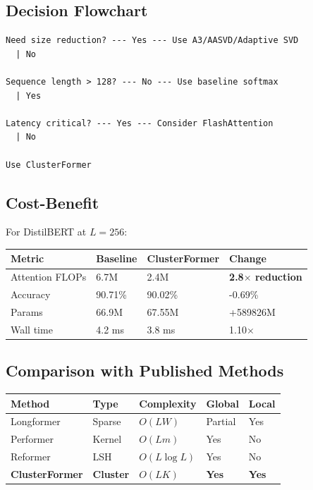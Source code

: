 \subsection{Decision Flowchart}

\begin{lstlisting}
Need size reduction? --- Yes --- Use A3/AASVD/Adaptive SVD
  | No
   
Sequence length > 128? --- No --- Use baseline softmax
  | Yes
   
Latency critical? --- Yes --- Consider FlashAttention
  | No
   
Use ClusterFormer
\end{lstlisting}

\subsection{Cost-Benefit}

For DistilBERT at $L=256$:

\begin{table}[H]
\centering
\small
\begin{tabular}{llll}
\toprule
\textbf{Metric} & \textbf{Baseline} & \textbf{ClusterFormer} & \textbf{Change} \\
\midrule
Attention FLOPs & 6.7M & 2.4M & \textbf{2.8$\times$ reduction} \\
Accuracy & 90.71\% & 90.02\% & -0.69\% \\
Params & 66.9M & 67.55M & +589826M \\
Wall time & 4.2 ms & 3.8 ms & 1.10$\times$ \\
\bottomrule
\end{tabular}
\end{table}

\subsection{Comparison with Published Methods}

\begin{table}[H]
\centering
\small
\begin{tabular}{lllll}
\toprule
\textbf{Method} & \textbf{Type} & \textbf{Complexity} & \textbf{Global} & \textbf{Local} \\
\midrule
Longformer & Sparse & $O(LW)$ & Partial & Yes \\
Performer & Kernel & $O(Lm)$ & Yes & No \\
Reformer & LSH & $O(L\log L)$ & Yes & No \\
\textbf{ClusterFormer} & \textbf{Cluster} & \textbf{$O(LK)$} & \textbf{Yes} & \textbf{Yes} \\
\bottomrule
\end{tabular}
\end{table}

